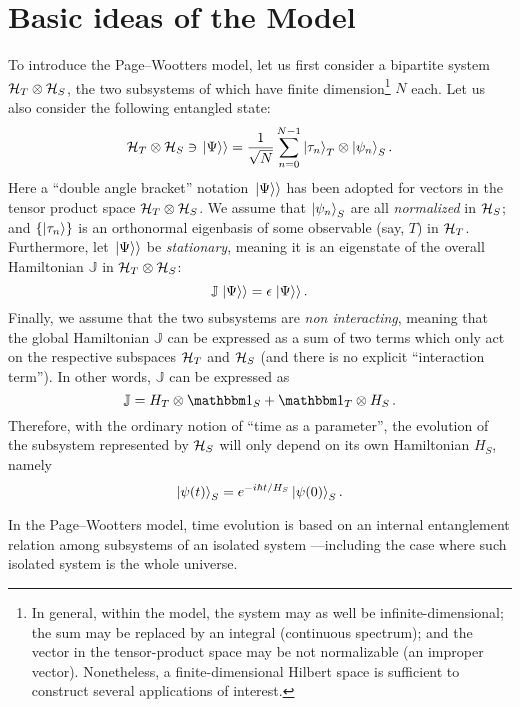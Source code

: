 \section{Basic ideas of the Model}

To introduce the Page--Wootters model, let us first consider
a bipartite system $\mathcal{H}_T \otimes \mathcal{H}_S$,
the two subsystems of which have finite dimension\footnote{
  In general, within the model,
  the system may as well be infinite-dimensional;
  the sum may be replaced by an integral (continuous spectrum);
  and the vector in the tensor-product space may be not normalizable (an improper vector).
  Nonetheless, a finite-dimensional Hilbert space is sufficient to construct several applications of interest.
} $N$ each.
Let us also consider the following entangled state:
\begin{equation}\label{eq:pw:finite-entanglement}
  \mathcal{H}_T \otimes \mathcal{H}_S \ni \left.\left| \Psi \right\rangle\right\rangle
  =
  \frac{1}{\sqrt{N}} \sum_{n=0}^{N-1} \ket{\tau_{n}}_{T} \otimes \ket{\psi_{n}}_{S} \text{.}
\end{equation}
Here
a ``double angle bracket'' notation $\left.\left| \Psi \right\rangle\right\rangle$ has been adopted
for vectors in the tensor product space $\mathcal{H}_T \otimes \mathcal{H}_S$.
We assume that $\ket{\psi_{n}}_{S}$ are all \emph{normalized} in $\mathcal{H}_S$;
and
$\qty{\ket{{\tau}_n}}$ is an orthonormal eigenbasis of some observable (say, $T$) in $\mathcal{H}_T$.
Furthermore, let $\left.\left| \Psi \right\rangle\right\rangle$ be \emph{stationary}, meaning it is an eigenstate
of the overall Hamiltonian $\mathbb{J}$ in $\mathcal{H}_T \otimes \mathcal{H}_S$:
$$
  \mathbb{J} \left.\left| \Psi \right\rangle\right\rangle = \epsilon \left.\left| \Psi \right\rangle\right\rangle \text{.}
$$
Finally, we assume that the two subsystems
are \emph{non interacting},
meaning that the global Hamiltonian $\mathbb{J}$ can be expressed as a sum of two terms
which only act on the respective subspaces $\mathcal{H}_T$ and $\mathcal{H}_S$
(and there is no explicit ``interaction term''). In other words,
$\mathbb{J}$ can be expressed as
$$
  \mathbb{J} = H_T \ox \idop_S + \idop_T \ox H_S \, \text{.} 
$$
Therefore, with the ordinary notion of ``time as a parameter'',
the evolution of the subsystem represented by $\mathcal{H}_S$
will only depend on its own
Hamiltonian $H_S$, namely
\begin{equation}\label{eq:pw:ordinary_S}
  \ket{\psi(t)}_S = e^{- i \hbar t / H_S } \ket{\psi(0)}_S \text{.}  
\end{equation}
 
In the Page--Wootters model, time evolution is based on an internal entanglement
relation among subsystems of an isolated system
---including the case where such isolated system is the whole universe.

